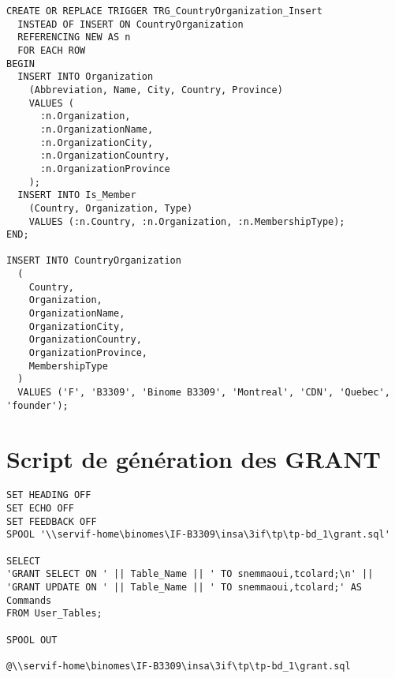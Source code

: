 \documentclass[11pt,a4paper]{article}
\begin{document}
\begin{lstlisting}
CREATE OR REPLACE TRIGGER TRG_CountryOrganization_Insert
  INSTEAD OF INSERT ON CountryOrganization
  REFERENCING NEW AS n
  FOR EACH ROW
BEGIN
  INSERT INTO Organization
    (Abbreviation, Name, City, Country, Province)
    VALUES (
      :n.Organization,
      :n.OrganizationName,
      :n.OrganizationCity,
      :n.OrganizationCountry,
      :n.OrganizationProvince
    );
  INSERT INTO Is_Member
    (Country, Organization, Type)
    VALUES (:n.Country, :n.Organization, :n.MembershipType);
END;

INSERT INTO CountryOrganization
  (
    Country,
    Organization,
    OrganizationName,
    OrganizationCity,
    OrganizationCountry,
    OrganizationProvince,
    MembershipType
  )
  VALUES ('F', 'B3309', 'Binome B3309', 'Montreal', 'CDN', 'Quebec', 'founder');
\end{lstlisting}

\section{Script de génération des GRANT}

\begin{lstlisting}
SET HEADING OFF
SET ECHO OFF
SET FEEDBACK OFF
SPOOL '\\servif-home\binomes\IF-B3309\insa\3if\tp\tp-bd_1\grant.sql'

SELECT
'GRANT SELECT ON ' || Table_Name || ' TO snemmaoui,tcolard;\n' ||
'GRANT UPDATE ON ' || Table_Name || ' TO snemmaoui,tcolard;' AS Commands
FROM User_Tables;

SPOOL OUT

@\\servif-home\binomes\IF-B3309\insa\3if\tp\tp-bd_1\grant.sql
\end{lstlisting}
\end{document}

